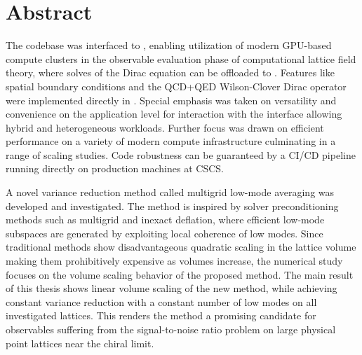 \begingroup
\let\clearpage\relax
\let\cleardoublepage\relax
\let\cleardoublepage\relax

\chapter*{Abstract}

The \openqxd codebase was interfaced to \quda, enabling utilization of modern GPU-based compute clusters in the observable evaluation phase of computational lattice field theory, where solves of the Dirac equation can be offloaded to \quda.
Features like spatial \Cstar boundary conditions and the QCD+QED Wilson-Clover Dirac operator were implemented directly in \quda.
Special emphasis was taken on versatility and convenience on the application level for interaction with the interface allowing hybrid and heterogeneous workloads.
Further focus was drawn on efficient performance on a variety of modern compute infrastructure culminating in a range of scaling studies.
Code robustness can be guaranteed by a CI/CD pipeline running directly on production machines at CSCS.

A novel variance reduction method called multigrid low-mode averaging was developed and investigated.
The method is inspired by solver preconditioning methods such as multigrid and inexact deflation, where efficient low-mode subspaces are generated by exploiting local coherence of low modes.
Since traditional methods show disadvantageous quadratic scaling in the lattice volume making them prohibitively expensive as volumes increase, the numerical study focuses on the volume scaling behavior of the proposed method.
The main result of this thesis shows linear volume scaling of the new method, while achieving constant variance reduction with a constant number of low modes on all investigated lattices.
This renders the method a promising candidate for observables suffering from the signal-to-noise ratio problem on large physical point lattices near the chiral limit.

\endgroup

\cleardoublepage%

\begingroup
\let\clearpage\relax
\let\cleardoublepage\relax
\let\cleardoublepage\relax

